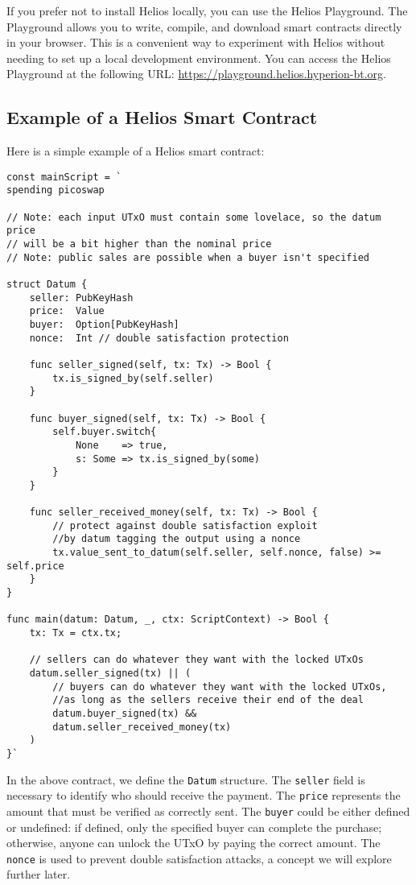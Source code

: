 If you prefer not to install Helios locally, you can use the Helios Playground. The Playground allows you to write, compile, and download smart contracts directly in your browser. This is a convenient way to experiment with Helios without needing to set up a local development environment. You can access the Helios Playground at the following URL: \url{https://playground.helios.hyperion-bt.org}.

\subsection{Example of a Helios Smart Contract}

Here is a simple example of a Helios smart contract:

\begin{verbatim}
const mainScript = `
spending picoswap

// Note: each input UTxO must contain some lovelace, so the datum price
// will be a bit higher than the nominal price
// Note: public sales are possible when a buyer isn't specified

struct Datum {
    seller: PubKeyHash
    price:  Value              
    buyer:  Option[PubKeyHash]
    nonce:  Int // double satisfaction protection

    func seller_signed(self, tx: Tx) -> Bool {
        tx.is_signed_by(self.seller)
    }

    func buyer_signed(self, tx: Tx) -> Bool {
        self.buyer.switch{
            None    => true,
            s: Some => tx.is_signed_by(some)
        }
    }

    func seller_received_money(self, tx: Tx) -> Bool {
        // protect against double satisfaction exploit 
        //by datum tagging the output using a nonce
        tx.value_sent_to_datum(self.seller, self.nonce, false) >= self.price
    }
}

func main(datum: Datum, _, ctx: ScriptContext) -> Bool {
    tx: Tx = ctx.tx;

    // sellers can do whatever they want with the locked UTxOs
    datum.seller_signed(tx) || (
        // buyers can do whatever they want with the locked UTxOs, 
        //as long as the sellers receive their end of the deal
        datum.buyer_signed(tx) && 
        datum.seller_received_money(tx)
    )
}`
\end{verbatim}

In the above contract, we define the \texttt{Datum} structure. The \texttt{seller} field is necessary to identify who should receive the payment. The \texttt{price} represents the amount that must be verified as correctly sent. The \texttt{buyer} could be either defined or undefined: if defined, only the specified buyer can complete the purchase; otherwise, anyone can unlock the UTxO by paying the correct amount. The \texttt{nonce} is used to prevent double satisfaction attacks, a concept we will explore further later.


